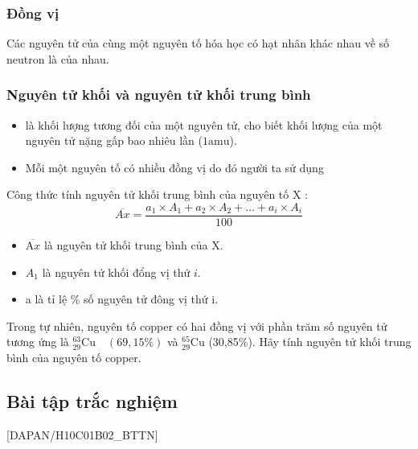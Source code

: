 \subsubsection{Đồng vị}
\begin{kngsnd}
	Các nguyên tử của cùng một nguyên tố hóa học có hạt nhân khác nhau về số neutron là  của nhau.
\end{kngsnd}
\subsubsection{Nguyên tử khối và nguyên tử khối trung bình}
\begin{kngsnd}
	\begin{itemize}
		\item {} là khối lượng tương đối của một nguyên tử, cho biết khối lượng của một nguyên tử nặng gấp bao nhiêu lần  ($1\mathrm{amu} $).
		\item Mỗi một nguyên tố có nhiều đồng vị do đó người ta sử dụng 
	\end{itemize}
\end{kngsnd}
\begin{hoplythuyet}
	Công thức tính nguyên tử khối trung bình của nguyên tố $\mathrm{X}$ :
	$$
	\overline{A x}=\frac{a_1 \times A_1+a_2 \times A_2+\ldots+a_i \times A_i}{100}
	$$
	\begin{itemize}
\item $\overline{\mathrm{A} x}$ là nguyên tử khối trung bình của $\mathrm{X}$.
\item $A_1$ là nguyên tử khối đổng vị thứ $i$.
\item a là tỉ lệ \% số nguyên tử đông vị thứ i.
	\end{itemize}
\end{hoplythuyet}
\begin{hoivadap}
	Trong tự nhiên, nguyên tố copper có hai đồng vị với phần trăm số nguyên tử tương ứng
	là ${ }_{29}^{63} \mathrm{Cu} \quad(69,15 \%)$ và ${ }_{29}^{65} \mathrm{Cu}$
	(30,85\%). Hãy tính nguyên tử
	khối trung bình của nguyên tố copper.
\end{hoivadap}

\subsection{Bài tập trắc nghiệm}

[DAPAN/H10C01B02_BTTN]


